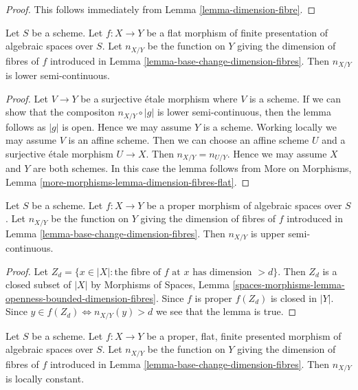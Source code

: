 \begin{proof}
This follows immediately from
Lemma \ref{lemma-dimension-fibre}.
\end{proof}

\begin{lemma}
\label{lemma-dimension-fibres-flat}
Let $S$ be a scheme.
Let $f : X \to Y$ be a flat morphism of finite presentation of
algebraic spaces over $S$. Let
$n_{X/Y}$ be the function on $Y$ giving the dimension of fibres of $f$
introduced in Lemma \ref{lemma-base-change-dimension-fibres}.
Then $n_{X/Y}$ is lower semi-continuous.
\end{lemma}

\begin{proof}
Let $V \to Y$ be a surjective \'etale morphism where $V$ is a scheme.
If we can show that the compositon $n_{X/Y} \circ |g|$
is lower semi-continuous, then the lemma follows as $|g|$ is open.
Hence we may assume $Y$ is a scheme.
Working locally we may assume $V$ is an affine scheme.
Then we can choose an affine scheme $U$ and a surjective
\'etale morphism $U \to X$. Then $n_{X/Y} = n_{U/Y}$.
Hence we may assume $X$ and $Y$ are both schemes.
In this case the lemma follows from
More on Morphisms, Lemma \ref{more-morphisms-lemma-dimension-fibres-flat}.
\end{proof}

\begin{lemma}
\label{lemma-dimension-fibres-proper}
Let $S$ be a scheme.
Let $f : X \to Y$ be a proper morphism of algebraic spaces over $S$. Let
$n_{X/Y}$ be the function on $Y$ giving the dimension of fibres of $f$
introduced in Lemma \ref{lemma-base-change-dimension-fibres}.
Then $n_{X/Y}$ is upper semi-continuous.
\end{lemma}

\begin{proof}
Let $Z_d = \{x \in |X| :
\text{the fibre of }f\text{ at }x\text{ has dimension }> d\}$.
Then $Z_d$ is a closed subset of $|X|$ by
Morphisms of Spaces, Lemma
\ref{spaces-morphisms-lemma-openness-bounded-dimension-fibres}.
Since $f$ is proper $f(Z_d)$ is closed in $|Y|$.
Since $y \in f(Z_d) \Leftrightarrow n_{X/Y}(y) > d$
we see that the lemma is true.
\end{proof}

\begin{lemma}
\label{lemma-dimension-fibres-proper-flat}
Let $S$ be a scheme. Let $f : X \to Y$ be a proper, flat, finite presented
morphism of algebraic spaces over $S$.
Let $n_{X/Y}$ be the function on $Y$ giving the dimension of fibres of $f$
introduced in Lemma \ref{lemma-base-change-dimension-fibres}.
Then $n_{X/Y}$ is locally constant.
\end{lemma}


